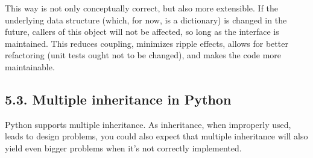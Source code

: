 \documentclass[a4paper,10pt,english]{sphinxmanual}
\begin{document}
\begin{sphinxVerbatim}[commandchars=\\\{\}]
 

       
           

       
        \PYG{p}{[}\PYG{p}{]}

      
         \PYG{p}{[}\PYG{p}{]}

     
         
\end{sphinxVerbatim}

This way is not only conceptually correct, but also more extensible. If the underlying data structure (which,
for now, is a dictionary) is changed in the future, callers of this object will not be affected, so long as
the interface is maintained. This reduces coupling, minimizes ripple effects, allows for better refactoring
(unit tests ought not to be changed), and makes the code more maintainable.


\subsection{5.3. Multiple inheritance in Python}
\label{\detokenize{chapters/3_general_traits/index:multiple-inheritance-in-python}}
Python supports multiple inheritance. As inheritance, when improperly used, leads to design problems, you
could also expect that multiple inheritance will also yield even bigger problems when it’s not correctly
implemented.
\end{document}
